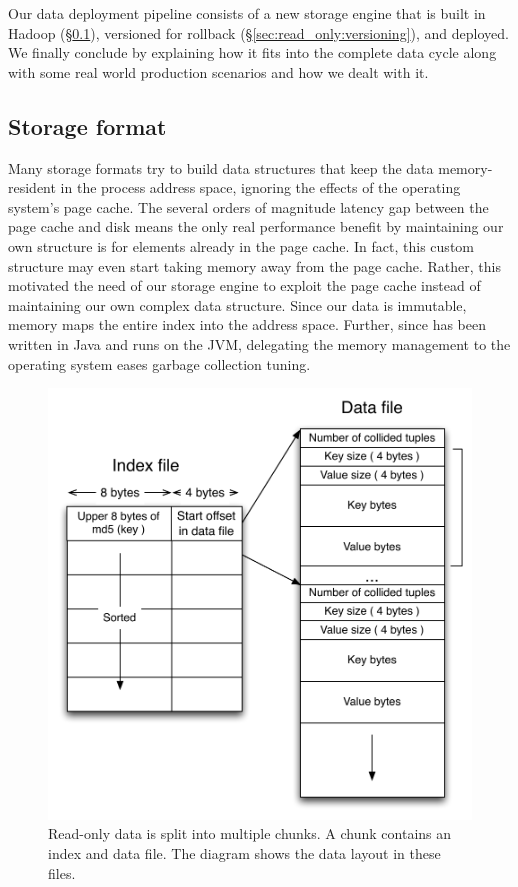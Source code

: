 Our data deployment pipeline consists of a new storage engine that
is built in Hadoop (\S\ref{sec:read_only:storage_format}), versioned
for rollback (\S\ref{sec:read_only:versioning}), and deployed. We
finally conclude by explaining how it fits into the complete data 
cycle along with some real world production scenarios and
how we dealt with it. 


\subsection{Storage format}
\label{sec:read_only:storage_format}

Many storage formats try to build data structures that keep the data
memory-resident in the process address space, ignoring the effects of
the operating system's page cache. The several orders of magnitude 
latency gap between the page cache and disk means the only real 
performance benefit by maintaining our own structure is for elements 
already in the page cache. In fact, this custom structure may even 
start taking memory away from the page cache. Rather, this motivated 
the need of our storage engine to exploit the page cache instead of 
maintaining our own complex data structure. Since our data is immutable, 
\projectname{} memory maps the entire index into the address space. 
Further, since \projectname{} has been written in Java and runs on 
the JVM, delegating the memory management to the operating system 
eases garbage collection tuning.

\begin{figure}
  \centering
    \includegraphics[scale=0.45]{images/storage_format.pdf}
  \caption{Read-only data is split into multiple chunks. A chunk contains an index and data file. The diagram shows the data layout in these files.}
  \label{storage_format}
\end{figure}

